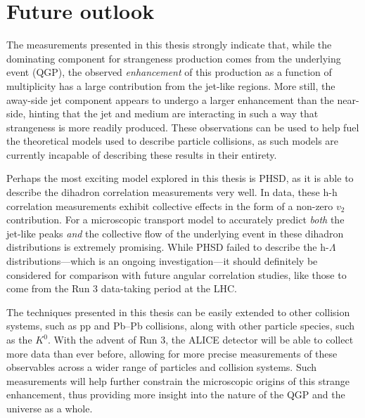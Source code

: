 \section{Future outlook}

The measurements presented in this thesis strongly indicate that, while the dominating component for strangeness production comes from the underlying event (QGP), the observed \textit{enhancement} of this production as a function of multiplicity has a large contribution from the jet-like regions. More still, the away-side jet component appears to undergo a larger enhancement than the near-side, hinting that the jet and medium are interacting in such a way that strangeness is more readily produced. These observations can be used to help fuel the theoretical models used to describe particle collisions, as such models are currently incapable of describing these results in their entirety. 

Perhaps the most exciting model explored in this thesis is PHSD, as it is able to describe the dihadron correlation measurements very well. In data, these h-h correlation measurements exhibit collective effects in the form of a non-zero $v_2$ contribution. For a microscopic transport model to accurately predict \textit{both} the jet-like peaks \textit{and} the collective flow of the underlying event in these dihadron distributions is extremely promising. While PHSD failed to describe the h-$\Lambda$ distributions---which is an ongoing investigation---it should definitely be considered for comparison with future angular correlation studies, like those to come from the Run 3 data-taking period at the LHC.

The techniques presented in this thesis can be easily extended to other collision systems, such as pp and Pb--Pb collisions, along with other particle species, such as the $K^0$. With the advent of Run 3, the ALICE detector will be able to collect more data than ever before, allowing for more precise measurements of these observables across a wider range of particles and collision systems. Such measurements will help further constrain the microscopic origins of this strange enhancement, thus providing more insight into the nature of the QGP and the universe as a whole.
